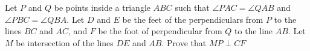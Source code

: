 Let $P$ and $Q$ be points inside a triangle $ABC$ such that $\angle PAC = \angle QAB$ and $\angle PBC = \angle QBA$. Let $D$ and $E$ be the feet of the perpendiculars from $P$ to the lines $BC$ and $AC$, and $F$ be the foot of perpendicular from $Q$ to the line $AB$. Let $M$ be intersection of the lines $DE$ and $AB$. Prove that $MP \perp CF$